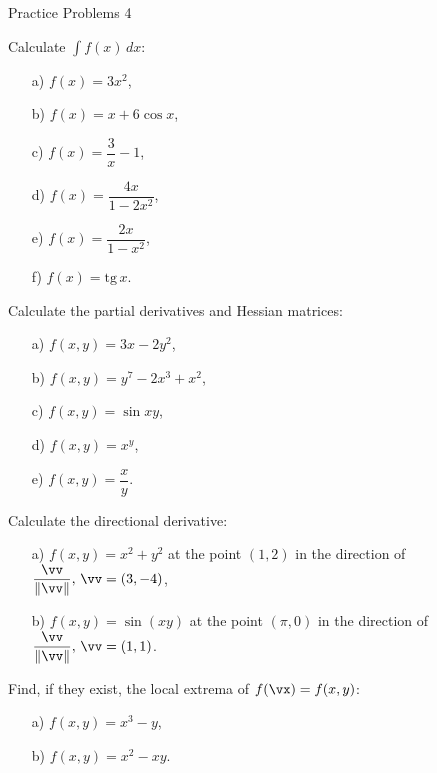  \begin{center}\begin{large} Practice Problems 4
 \end{large}\end{center}
 \bigskip

\begin{problem}
    Calculate $\displaystyle \int f(x)\, dx$:
    \begin{enumerate}
        \item[a) ] $f(x)=3x^2$,
        \item[b) ] $f(x)=x+6\cos x$,
        \item[c) ] $f(x)=\dfrac{3}{x}-1$,
        \item[d) ] $f(x)=\dfrac{4x}{1-2x^2}$,
        \item[e) ] $f(x)=\dfrac{2x}{1-x^2}$,
        \item[f) ] $f(x)=\text{tg}\,x$.
    \end{enumerate}
\end{problem}

\bigskip

\begin{problem}
Calculate the partial derivatives and Hessian matrices:
\begin{enumerate}
        \item[a) ] $f(x,y)=3x-2y^2$,
        \item[b) ] $f(x,y)=y^7-2x^3+x^2$,
        \item[c) ] $f(x,y)=\sin{xy}$,
        \item[d) ] $f(x,y)=x^y$,
        \item[e) ] $f(x,y)=\dfrac{x}{y}$.
    \end{enumerate}
\end{problem}

\newpage

\begin{problem}
Calculate the directional derivative:
\begin{enumerate}
        \item[a) ] $f(x, y) = x^2+y^2$ at the point $(1, 2)$ in the direction of $\dfrac{\vv}{\|\vv\|},\,\vv = (3,-4)$,
        \item[b) ] $f(x, y) = \sin(xy)$ at the point $(\pi, 0)$ in the direction of $\dfrac{\vv}{\|\vv\|},\,\vv = (1,1)$.
    \end{enumerate}
\end{problem}

\bigskip

\begin{problem}
Find, if they exist, the local extrema of $f(\vx)=f(x,y)$:
\begin{enumerate}
        \item[a) ] $f(x,y)=x^3-y$,
        \item[b) ] $f(x,y)=x^2-xy$.
    \end{enumerate}
\end{problem}
\bigskip

